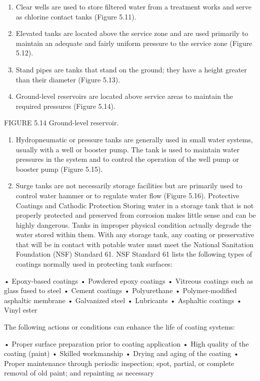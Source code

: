 \documentclass{article}
\begin{document}
\begin{enumerate}
\item
  Clear wells are used to store filtered water from a treatment works
  and serve as chlorine contact tanks (Figure 5.11).
\item
  Elevated tanks are located above the service zone and are used
  primarily to maintain an adequate and fairly uniform pressure to the
  service zone (Figure 5.12).
\item
  Stand pipes are tanks that stand on the ground; they have a height
  greater than their diameter (Figure 5.13).
\item
  Ground-level reservoirs are located above service areas to maintain
  the required pressures (Figure 5.14).
\end{enumerate}

FIGURE 5.14 Ground-level reservoir.

\begin{enumerate}
\item
  Hydropneumatic or pressure tanks are generally used in small water
  systems, usually with a well or booster pump. The tank is used to
  maintain water pressures in the system and to control the operation of
  the well pump or booster pump (Figure 5.15).
\item
  Surge tanks are not necessarily storage facilities but are primarily
  used to control water hammer or to regulate water flow (Figure 5.16).
  Protective Coatings and Cathodic Protection Storing water in a storage
  tank that is not properly protected and preserved from corrosion makes
  little sense and can be highly dangerous. Tanks in improper physical
  condition actually degrade the water stored within them. With any
  storage tank, any coating or preservative that will be in contact with
  potable water must meet the National Sanitation Foundation (NSF)
  Standard 61. NSF Standard 61 lists the following types of coatings
  normally used in protecting tank surfaces:
\end{enumerate}

• Epoxy-based coatings • Powdered epoxy coatings • Vitreous coatings
such as glass fused to steel • Cement coatings • Polyurethane •
Polymer-modified asphaltic membrane • Galvanized steel • Lubricants •
Asphaltic coatings • Vinyl ester

The following actions or conditions can enhance the life of coating
systems:

• Proper surface preparation prior to coating application • High quality
of the coating (paint) • Skilled workmanship • Drying and aging of the
coating • Proper maintenance through periodic inspection; spot, partial,
or complete removal of old paint; and repainting as necessary
\end{document}
